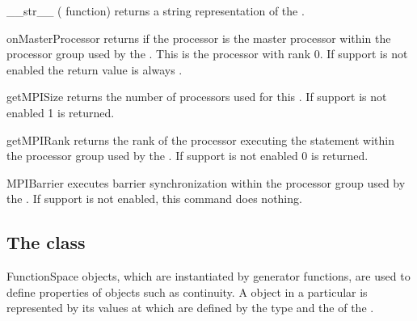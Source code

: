 %
\begin{methoddesc}[Domain]{__str__}{}
    (\PYTHON {} function) returns a string representation of the
    \Domain.
\end{methoddesc}
%
\begin{methoddesc}[Domain]{onMasterProcessor}{}
    returns \True if the processor is the master processor within the \MPI
    processor group used by the \Domain. This is the processor with rank 0.
    If \MPI support is not enabled the return value is always \True.
\end{methoddesc}
%
\begin{methoddesc}[Domain]{getMPISize}{}
    returns the number of \MPI processors used for this \Domain. If \MPI
    support is not enabled 1 is returned.
\end{methoddesc}
%
\begin{methoddesc}[Domain]{getMPIRank}{}
    returns the rank of the processor executing the statement within the
    \MPI processor group used by the \Domain. If \MPI support is not enabled
    0 is returned.
\end{methoddesc}
%
\begin{methoddesc}[Domain]{MPIBarrier}{}
    executes barrier synchronization within the \MPI processor group used by
    the \Domain. If \MPI support is not enabled, this command does nothing.
\end{methoddesc}

\subsection{The \FunctionSpace class}
\begin{classdesc}{FunctionSpace}{}
\FunctionSpace objects, which are instantiated by generator functions, are
used to define properties of \Data objects such as continuity.
A \Data object in a particular \FunctionSpace is represented by its values at
\DataSamplePoints which are defined by the type and the \Domain of the \FunctionSpace.
\end{classdesc}

